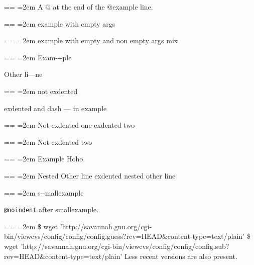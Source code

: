 \documentclass{book}
\makeatletter
\newenvironment{GNUTexinfopreformatted}{%
  \par\obeylines\obeyspaces\frenchspacing
  \parskip=\z@\parindent=\z@}{}
\makeatother
\begin{document}
\begin{GNUTexinfopreformatted}
\leftskip=2em\relax\ttfamily%
A @ at the end of the @example line.
\end{GNUTexinfopreformatted}

\begin{GNUTexinfopreformatted}
\leftskip=2em\relax\ttfamily%
example with empty args
\end{GNUTexinfopreformatted}

\begin{GNUTexinfopreformatted}
\leftskip=2em\relax\ttfamily%
example with empty and non empty args mix
\end{GNUTexinfopreformatted}

\begin{GNUTexinfopreformatted}
\leftskip=2em\relax\ttfamily%
Exam{-}{-}{-}ple

\end{GNUTexinfopreformatted}
\noindent Other li---ne
\begin{GNUTexinfopreformatted}
\leftskip=2em\relax\ttfamily%
not exdented
\end{GNUTexinfopreformatted}

\noindent exdented  and dash --- in example
\begin{GNUTexinfopreformatted}
\leftskip=2em\relax\ttfamily%
Not exdented one
\end{GNUTexinfopreformatted}
\noindent exdented two
\begin{GNUTexinfopreformatted}
\leftskip=2em\relax\ttfamily%
Not exdented two
\end{GNUTexinfopreformatted}

\begin{GNUTexinfopreformatted}
\leftskip=2em\relax\ttfamily%
Example   Hoho.
\end{GNUTexinfopreformatted}
\begin{GNUTexinfopreformatted}
\leftskip=2em\relax\ttfamily%
Nested Other line
\end{GNUTexinfopreformatted}
\noindent exdented nested other line

\begin{GNUTexinfopreformatted}
\leftskip=2em\relax\ttfamily\footnotesize%
s{-}{-}mallexample
\end{GNUTexinfopreformatted}

\texttt{@noindent} after smallexample.
\begin{GNUTexinfopreformatted}
\leftskip=2em\relax\ttfamily\footnotesize%
\$ wget 'http://savannah.gnu.org/cgi-bin/viewcvs/config/config/config.guess?rev=HEAD\&content-type=text/plain'
\$ wget 'http://savannah.gnu.org/cgi-bin/viewcvs/config/config/config.sub?rev=HEAD\&content-type=text/plain'
\end{GNUTexinfopreformatted}
\noindent{}Less recent versions are also present.
\end{document}
